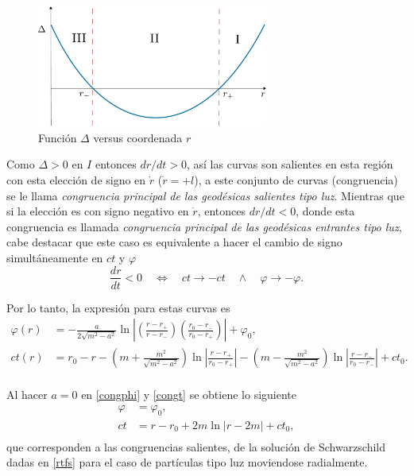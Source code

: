 \begin{figure}[H]
 \centering
\includegraphics[height=4cm,angle=0]{fig/fig-delta.pdf}
\caption{Funci\'on $\Delta$ versus coordenada $r$}
\label{fig:delta}
\end{figure}

Como $\Delta >0$ en $I$ entonces $dr/dt>0$, as\'i las curvas son salientes en esta regi\'on con esta elecci\'on de signo en $\dot{r}$ ($\dot{r}=+l$),  a este conjunto de curvas (congruencia) se le llama \textit{congruencia principal de las geod\'esicas salientes tipo luz}. Mientras que si la elecci\'on es con signo negativo en $\dot{r}$, entonces $dr/dt<0$, donde esta congruencia es llamada \textit{congruencia principal de las geod\'esicas entrantes tipo luz}, cabe destacar que este caso es equivalente a hacer el cambio de signo simult\'aneamente en $ct$ y $\varphi$
\begin{equation}
\frac{dr}{dt}<0 \quad \Longleftrightarrow \quad ct \rightarrow -ct \quad \wedge \quad \varphi \rightarrow -\varphi .
\end{equation}

Por lo tanto, la expresi\'on para estas curvas es
\begin{equation}
\begin{aligned}
\varphi(r)&=-\frac{a}{2\sqrt{m^2-a^2}}\ln \left|\left(\frac{r-r_+}{r-r_-}\right)\left(\frac{r_0-r_-}{r_0-r_+} \right)\right| + \varphi_0 ,\\
ct(r)&=r_0-r-\left(m+\frac{m^2}{\sqrt{m^2-a^2}} \right)\ln\left|\frac{r-r_+}{r_0-r_+}\right|-\left(m-\frac{m^2}{\sqrt{m^2-a^2}} \right)\ln \left|\frac{r-r_-}{r_0-r_-}\right|+ct_0.\\
\end{aligned}
\end{equation}

Al hacer $a=0$ en \eqref{congphi} y \eqref{congt} se obtiene lo siguiente
\begin{equation}
\begin{aligned}
\varphi &=\varphi_0 ,\\
ct&=r-r_0+2m\ln|r-2m|+ct_0,\\
\end{aligned}
\end{equation}
que corresponden a las congruencias salientes, de la soluci\'on de Schwarzschild dadas en \eqref{rtfs} para el caso de part\'iculas tipo luz moviendose radialmente.\\

